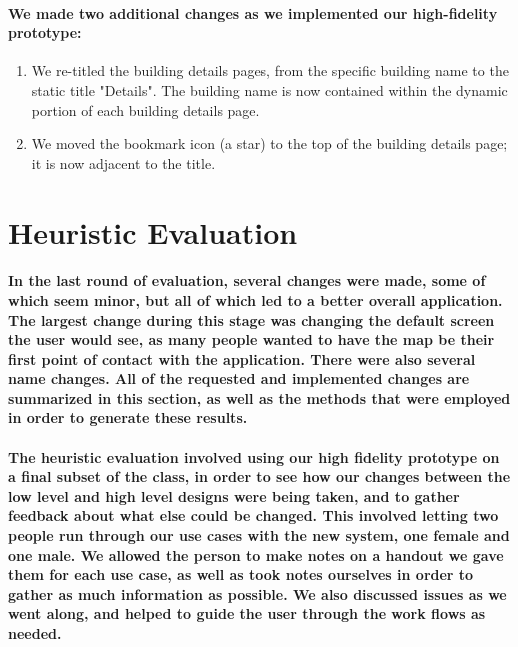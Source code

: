 \documentclass{report}
\begin{document}
    \paragraph{We made two additional changes as we implemented our
    high-fidelity prototype:}
    \begin{enumerate}
    \item We re-titled the building details pages, from the specific building
    name to the static title "Details". The building name is now contained within
    the dynamic portion of each building details page.
    \item We moved the bookmark icon (a star) to the top of the building details
    page; it is now adjacent to the title.
    \end{enumerate}
\section{Heuristic Evaluation}
    \paragraph{In the last round of evaluation, several changes were made, some
    of which seem minor, but all of which led to a better overall application. The
    largest change during this stage was changing the default screen the user would
    see, as many people wanted to have the map be their first point of contact with
    the application. There were also several name changes. All of the requested and
    implemented changes are summarized in this section, as well as the methods that
    were employed in order to generate these results.}
    \paragraph{The heuristic evaluation involved using our high fidelity
    prototype on a final subset of the class, in order to see how our changes
    between the low level and high level designs were being taken, and to gather
    feedback about what else could be changed. This involved letting two people run
    through our use cases with the new system, one female and one male. We allowed
    the person to make notes on a handout we gave them for each use case, as well as
    took notes ourselves in order to gather as much information as possible. We also
    discussed issues as we went along, and helped to guide the user through the work
    flows as needed.}
\end{document}
